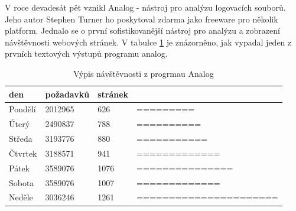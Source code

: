 \documentclass[bc,male,java,dept456]{diploma}						%
\begin{document}
V roce devadesát pět vznikl Analog - nástroj pro analýzu logovacích souborů. Jeho autor Stephen Turner ho poskytoval zdarma jako freeware pro několik platform. Jednalo se o první sofistikovanější nástroj pro analýzu a zobrazení návštěvnosti webových stránek. V tabulce \ref{table:analog_output} je znázorněno, jak vypadal jeden z prvních textových výstupů programu analog.

\begin{table}[h]
	\centering	
\begin{tabular}{p{2cm} p{3cm} p{2cm} p{5cm}}
den&požadavků&stránek&\\
\hline
Pondělí			& 2012965			& 626	& ========= \\
Úterý			& 2490837			& 788	& ========== \\
Středa			& 3193776			& 880	& =========== \\
Čtvrtek			& 3188571			& 941	& ============= \\
Pátek			& 3589076			& 1076	& ===============\\
Sobota			& 3589076			& 1007	& ============= \\
Neděle			& 3036246			& 1261	& ======================\\
\end{tabular}

	\caption{Výpis návštěvnosti z progrmau Analog} 
	\label{table:analog_output}
\end{table}
\end{document}
